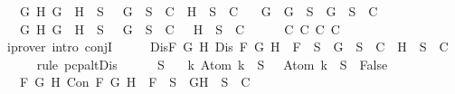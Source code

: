 \begin{isabellebody}
\ \ {\isasymand}\ {\isacharparenleft}{\isasymforall}G\ H{\isachardot}\ G\ \isactrlbold {\isasymrightarrow}\ H\ {\isasymin}\ S\ {\isasymlongrightarrow}\ {\isacharbraceleft}\isactrlbold {\isasymnot}\ G{\isacharbraceright}\ {\isasymunion}\ S\ {\isasymin}\ C\ {\isasymor}\ {\isacharbraceleft}H{\isacharbraceright}\ {\isasymunion}\ S\ {\isasymin}\ C{\isacharparenright}\isanewline
\ \ {\isasymand}\ {\isacharparenleft}{\isasymforall}G{\isachardot}\ \isactrlbold {\isasymnot}\ {\isacharparenleft}\isactrlbold {\isasymnot}G{\isacharparenright}\ {\isasymin}\ S\ {\isasymlongrightarrow}\ {\isacharbraceleft}G{\isacharbraceright}\ {\isasymunion}\ S\ {\isasymin}\ C{\isacharparenright}\isanewline
\ \ {\isasymand}\ {\isacharparenleft}{\isasymforall}G\ H{\isachardot}\ \isactrlbold {\isasymnot}{\isacharparenleft}G\ \isactrlbold {\isasymand}\ H{\isacharparenright}\ {\isasymin}\ S\ {\isasymlongrightarrow}\ {\isacharbraceleft}\isactrlbold {\isasymnot}\ G{\isacharbraceright}\ {\isasymunion}\ S\ {\isasymin}\ C\ {\isasymor}\ {\isacharbraceleft}\isactrlbold {\isasymnot}\ H{\isacharbraceright}\ {\isasymunion}\ S\ {\isasymin}\ C{\isacharparenright}{\isachardoublequoteclose}\isanewline
\ \ \ \ \isamarkupfalse%
\ C{}\ C{}\ C{}\ C{}\ \isamarkupfalse%
\ {\isacharparenleft}iprover\ intro{\isacharcolon}\ conjI{\isacharparenright}\isanewline
\ \ \isamarkupfalse%
\ \isamarkupfalse%
\ Dis{\isacharcolon}{\isachardoublequoteopen}{\isasymforall}F\ G\ H{\isachardot}\ Dis\ F\ G\ H\ {\isasymlongrightarrow}\ F\ {\isasymin}\ S\ {\isasymlongrightarrow}\ {\isacharbraceleft}G{\isacharbraceright}\ {\isasymunion}\ S\ {\isasymin}\ C\ {\isasymor}\ {\isacharbraceleft}H{\isacharbraceright}\ {\isasymunion}\ S\ {\isasymin}\ C{\isachardoublequoteclose}\isanewline
\ \ \ \ \isamarkupfalse%
\ {\isacharparenleft}rule\ pcp{\isacharunderscore}alt{}Dis{\isacharparenright}\isanewline
\ \ \isamarkupfalse%
\ {\isachardoublequoteopen}{\isasymbottom}\ {\isasymnotin}\ S\isanewline
\ \ {\isasymand}\ {\isacharparenleft}{\isasymforall}k{\isachardot}\ Atom\ k\ {\isasymin}\ S\ {\isasymlongrightarrow}\ \isactrlbold {\isasymnot}\ {\isacharparenleft}Atom\ k{\isacharparenright}\ {\isasymin}\ S\ {\isasymlongrightarrow}\ False{\isacharparenright}\isanewline
\ \ {\isasymand}\ {\isacharparenleft}{\isasymforall}F\ G\ H{\isachardot}\ Con\ F\ G\ H\ {\isasymlongrightarrow}\ F\ {\isasymin}\ S\ {\isasymlongrightarrow}\ {\isacharbraceleft}G{\isacharcomma}H{\isacharbraceright}\ {\isasymunion}\ S\ {\isasymin}\ C{\isacharparenright}\isanewline

\end{isabellebody}
